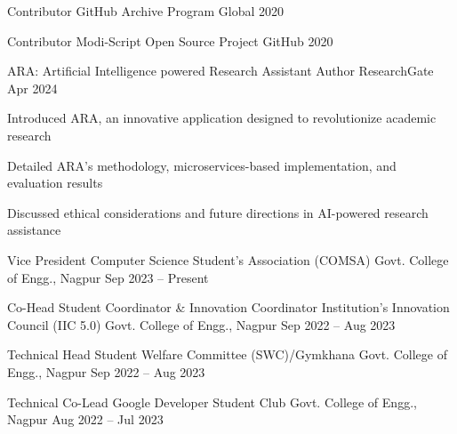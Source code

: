 \documentclass[11pt, a4paper]{awesome-cv}
\begin{document}
\begin{cvhonors}

  \cvhonor
    {Contributor} %
    {GitHub Archive Program} %
    {Global} %
    {2020} %

  \cvhonor
    {Contributor} %
    {Modi-Script Open Source Project} %
    {GitHub} %
    {2020} %

\end{cvhonors}



\begin{cventries}

\cventry
  {ARA: Artificial Intelligence powered Research Assistant}
  {Author}
  {ResearchGate}
  {Apr 2024}
  {
    \begin{cvitems}
      \item {Introduced ARA, an innovative application designed to revolutionize academic research}
      \item {Detailed ARA's methodology, microservices-based implementation, and evaluation results}
      \item {Discussed ethical considerations and future directions in AI-powered research assistance}
    \end{cvitems}
  }

\end{cventries}


\begin{cventries}

\cventry
  {Vice President}
  {Computer Science Student's Association (COMSA)}
  {Govt. College of Engg., Nagpur}
  {Sep 2023 -- Present}
  {}

\cventry
  {Co-Head Student Coordinator \& Innovation Coordinator}
  {Institution's Innovation Council (IIC 5.0)}
  {Govt. College of Engg., Nagpur}
  {Sep 2022 -- Aug 2023}
  {}

\cventry
  {Technical Head}
  {Student Welfare Committee (SWC)/Gymkhana}
  {Govt. College of Engg., Nagpur}
  {Sep 2022 -- Aug 2023}
  {}

\cventry
  {Technical Co-Lead}
  {Google Developer Student Club}
  {Govt. College of Engg., Nagpur}
  {Aug 2022 -- Jul 2023}
  {}

\end{cventries}
\end{document}
